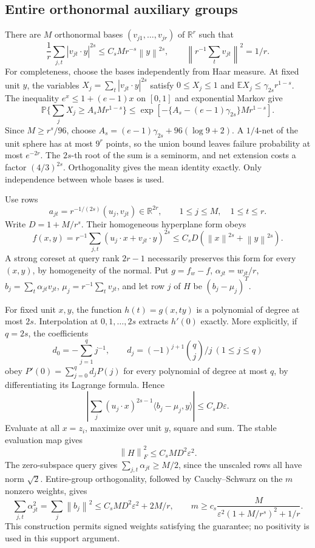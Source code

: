 \documentclass[11pt]{article}
\theoremstyle{remark}\newtheorem{remark}[theorem]{Remark}
\newcommand{\R}{\mathbb R}\newcommand{\E}{\mathbb E}\newcommand{\Prob}{\mathbb P}
\newcommand{\eps}{\varepsilon}\newcommand{\Sym}{\operatorname{Sym}}
\newcommand{\norm}[1]{\left\|#1\right\|}\newcommand{\ip}[2]{\left\langle #1,#2\right\rangle}
\begin{document}
\subsection{Entire orthonormal auxiliary groups}
There are $M$ orthonormal bases $(v_{j1},\ldots,v_{jr})$ of $\R^r$ such that
\begin{equation}\label{eq:variable-noise}
 \frac1r\sum_{j,t}|v_{jt}\cdot y|^{2s}\le C_sMr^{-s}\norm y^{2s},
 \qquad \norm{r^{-1}\sum_t v_{jt}}^2=1/r.
\end{equation}
For completeness, choose the bases independently from Haar measure. At fixed unit $y$, the variables $X_j=\sum_t|v_{jt}\cdot y|^{2s}$ satisfy $0\le X_j\le1$ and $\E X_j\le\gamma_{2s}r^{1-s}$. The inequality $e^x\le1+(e-1)x$ on $[0,1]$ and exponential Markov give
\[
 \Prob\{\sum_jX_j\ge A_sMr^{1-s}\}
 \le\exp[-\{A_s-(e-1)\gamma_{2s}\}Mr^{1-s}].
\]
Since $M\ge r^s/96$, choose $A_s=(e-1)\gamma_{2s}+96(\log9+2)$. A $1/4$-net of the unit sphere has at most $9^r$ points, so the union bound leaves failure probability at most $e^{-2r}$. The $2s$-th root of the sum is a seminorm, and net extension costs a factor $(4/3)^{2s}$. Orthogonality gives the mean identity exactly. Only independence between whole bases is used.

Use rows
\[
 a_{jt}=r^{-1/(2s)}(u_j,v_{jt})\in\R^{2r},\qquad 1\le j\le M,\quad1\le t\le r.
\]
Write $D=1+M/r^s$. Their homogeneous hyperplane form obeys
\[
 f(x,y)=r^{-1}\sum_{j,t}(u_j\cdot x+v_{jt}\cdot y)^{2s}
 \le C_sD(\norm x^{2s}+\norm y^{2s}).
\]
A strong coreset at query rank $2r-1$ necessarily preserves this form for every $(x,y)$, by homogeneity of the normal. Put $g=f_w-f$, $\alpha_{jt}=w_{jt}/r$, $b_j=\sum_t\alpha_{jt}v_{jt}$, $\mu_j=r^{-1}\sum_tv_{jt}$, and let row $j$ of $H$ be $(b_j-\mu_j)^T$.

For fixed unit $x,y$, the function $h(t)=g(x,ty)$ is a polynomial of degree at most $2s$. Interpolation at $0,1,\ldots,2s$ extracts $h'(0)$ exactly. More explicitly, if $q=2s$, the coefficients
\[
 d_0=-\sum_{j=1}^q j^{-1},\qquad d_j=(-1)^{j+1}\binom qj/j\ (1\le j\le q)
\]
obey $P'(0)=\sum_{j=0}^q d_jP(j)$ for every polynomial of degree at most $q$, by differentiating its Lagrange formula. Hence
\[
 \left|\sum_j(u_j\cdot x)^{2s-1}\langle b_j-\mu_j,y\rangle\right|\le C_sD\eps.
\]
Evaluate at all $x=z_i$, maximize over unit $y$, square and sum. The stable evaluation map gives
\[
 \norm H_F^2\le C_sMD^2\eps^2.
\]
The zero-subspace query gives $\sum_{j,t}\alpha_{jt}\ge M/2$, since the unscaled rows all have norm $\sqrt2$. Entire-group orthogonality, followed by Cauchy--Schwarz on the $m$ nonzero weights, gives
\[
 \sum_{j,t}\alpha_{jt}^2=\sum_j\norm{b_j}^2\le C_sMD^2\eps^2+2M/r,
 \qquad m\ge c_s\frac{M}{\eps^2(1+M/r^s)^2+1/r}.\tag{*}
\]
This construction permits signed weights satisfying the guarantee; no positivity is used in this support argument.
\end{document}
